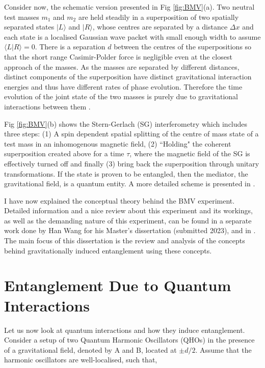 \documentclass[12pt,a4paper]{report}
\theoremstyle{plain}
\theoremstyle{definition}
\theoremstyle{remark}
\begin{document}
 Consider now, the schematic version presented in Fig \ref{fig:BMV}(a). Two neutral test masses $m_1$ and $m_2$ are held steadily in a superposition of two spatially separated states $|L\rangle$ and  $|R\rangle$, whose centres are separated by a distance $\Delta x$ and each state is a localised Gaussian wave packet with small enough width to assume $\langle L|R\rangle = 0$. There is a separation $d$ between the centres of the superpositions so that the short range Casimir-Polder force is negligible even at the closest approach of the masses. As the masses are separated by different distances, distinct components of the superposition have distinct gravitational interaction energies and thus have different rates of phase evolution. Therefore the time evolution of the joint state of the two masses is purely due to gravitational interactions between them \cite{Bose_2017}.

Fig \ref{fig:BMV}(b) shows the Stern-Gerlach (SG) interferometry which includes three steps: (1) A spin dependent spatial splitting of the centre of mass state of a test mass in an inhomogenous magnetic field, (2) ``Holding" the coherent superposition created above for a time $\tau$, where the magnetic field of the SG is effectively turned off and finally (3) bring back the superposition through unitary transformations. If the state is proven to be entangled, then the mediator, the gravitational field, is a quantum entity. A more detailed scheme is presented in \citet{Bose_2017}.

I have now explained the conceptual theory behind the BMV experiment. Detailed information and a nice review about this experiment and its workings, as well as the demanding nature of this experiment, can be found in a separate work done by Han Wang \cite{han} for his Master's dissertation (submitted 2023), and in \citet{Christodoulou_2020}. The main focus of this dissertation is the review and analysis of the concepts behind gravitationally induced entanglement using these concepts.

\section{Entanglement Due to Quantum Interactions} \label{sec: QHOs}
Let us now look at quantum interactions and how they induce entanglement. Consider a setup of two Quantum Harmonic Oscillators (QHOs) in the presence of a gravitational field, denoted by A and B, located at $\pm d/2$. Assume that the harmonic oscillators are well-localised, such that,
\end{document}
